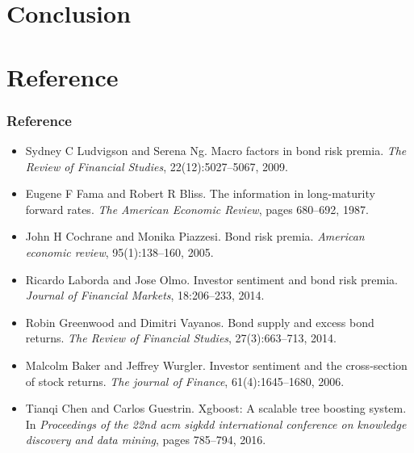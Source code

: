 \documentclass{beamer}
\begin{document}
\section{Conclusion}

\section*{Reference}
\frame
{
    \frametitle{Reference}

    \begin{itemize}
        \item 
        \footnotesize{Sydney C Ludvigson and Serena Ng. Macro factors in bond risk premia. \textit{The Review of Financial Studies}, 22(12):5027–5067, 2009.}
        \item
        \footnotesize{Eugene F Fama and Robert R Bliss. The information in long-maturity forward rates. \textit{The American Economic Review}, pages 680–692, 1987.}
        \item
        \footnotesize{John H Cochrane and Monika Piazzesi. Bond risk premia. \textit{American economic review}, 95(1):138–160, 2005.}
        \item
        \footnotesize{Ricardo Laborda and Jose Olmo. Investor sentiment and bond risk premia. \textit{Journal of Financial Markets}, 18:206–233, 2014.}
        \item
        \footnotesize{Robin Greenwood and Dimitri Vayanos. Bond supply and excess bond returns. \textit{The Review of Financial Studies}, 27(3):663–713, 2014.}
        \item
        \footnotesize{Malcolm Baker and Jeffrey Wurgler. Investor sentiment and the cross-section of stock returns. \textit{The journal of Finance}, 61(4):1645–1680, 2006.}
        \item
        \footnotesize{Tianqi Chen and Carlos Guestrin. Xgboost: A scalable tree boosting system. In \textit{Proceedings of the 22nd acm sigkdd international conference on knowledge discovery and data mining}, pages 785–794, 2016.}
    \end{itemize}
}
\end{document}
